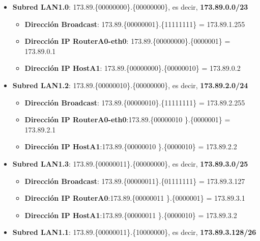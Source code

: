 \begin{itemize}
	\item{\textbf{Subred LAN1.0}:} 173.89.\{\textcolor{azul}{000000}\textcolor{rojo}{0}0\}.\{00000000\}, es decir, \textbf{173.89.0.0/23}
		\begin{itemize}
			\item{\textbf{Dirección Broadcast}}: 173.89.\{\textcolor{azul}{000000}\textcolor{rojo}{0}1\}.\{11111111\} = 173.89.1.255
			\item{\textbf{Dirección IP RouterA0-eth0}}: 173.89.\{\textcolor{azul}{000000}\textcolor{rojo}{0}0\}.\{0000001\} = 173.89.0.1
			\item{\textbf{Dirección IP HostA1}}: 173.89.\{\textcolor{azul}{000000}\textcolor{rojo}{0}0\}.\{00000010\} = 173.89.0.2
		\end{itemize}
	\item{\textbf{Subred LAN1.2}:} 173.89.\{\textcolor{azul}{000000}\textcolor{rojo}{10}\}.\{00000000\}, es decir, \textbf{173.89.2.0/24}
		\begin{itemize}
			\item{\textbf{Dirección Broadcast}}: 173.89.\{\textcolor{azul}{000000}\textcolor{rojo}{10}\}.\{11111111\} = 173.89.2.255
			\item{\textbf{Dirección IP RouterA0-eth0}}:173.89.\{\textcolor{azul}{000000}\textcolor{rojo}{10} \}.\{0000001\} = 173.89.2.1
			\item{\textbf{Dirección IP HostA1}}:173.89.\{\textcolor{azul}{000000}\textcolor{rojo}{10} \}.\{0000010\} = 173.89.2.2
		\end{itemize}
	\item{\textbf{Subred LAN1.3}:} 173.89.\{\textcolor{azul}{000000}\textcolor{rojo}{11}\}.\{\textcolor{rojo}{0}0000000\}, es decir, \textbf{173.89.3.0/25}
		\begin{itemize}
			\item{\textbf{Dirección Broadcast}}: 173.89.\{\textcolor{azul}{000000}\textcolor{rojo}{11}\}.\{\textcolor{rojo}{0}1111111\} = 173.89.3.127
			\item{\textbf{Dirección IP RouterA0}}:173.89.\{\textcolor{azul}{000000}\textcolor{rojo}{11} \}.\{\textcolor{rojo}{0}000001\} = 173.89.3.1
			\item{\textbf{Dirección IP HostA1}}:173.89.\{\textcolor{azul}{000000}\textcolor{rojo}{11} \}.\{\textcolor{rojo}{0}000010\} = 173.89.3.2
		\end{itemize}
	\item{\textbf{Subred LAN1.1}:} 173.89.\{\textcolor{azul}{000000}\textcolor{rojo}{11}\}.\{\textcolor{rojo}{10}000000\}, es decir, \textbf{173.89.3.128/26}

\end{itemize}
